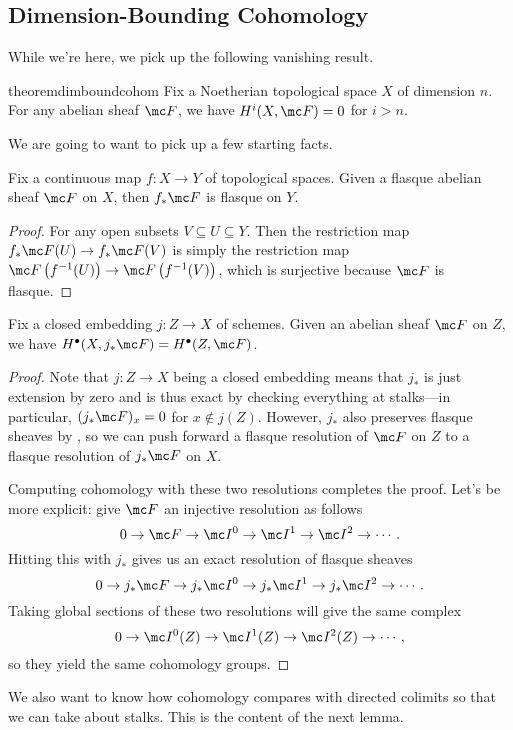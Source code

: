 \documentclass[../notes.tex]{subfiles}
\begin{document}
\subsection{Dimension-Bounding Cohomology}
While we're here, we pick up the following vanishing result.
\begin{restatable}{theorem}{dimboundcohom} \label{thm:dimension-bound-cohom}
	Fix a Noetherian topological space $X$ of dimension $n$. For any abelian sheaf $\mc F$, we have $H^i(X,\mc F)=0$ for $i>n$.
\end{restatable}
We are going to want to pick up a few starting facts.
\begin{lemma} \label{lem:pull-preserves-flasque}
	Fix a continuous map $f\colon X\to Y$ of topological spaces. Given a flasque abelian sheaf $\mc F$ on $X$, then $f_*\mc F$ is flasque on $Y$.
\end{lemma}
\begin{proof}
	For any open subsets $V\subseteq U\subseteq Y$. Then the restriction map $f_*\mc F(U)\to f_*\mc F(V)$ is simply the restriction map $\mc F\left(f^{-1}(U)\right)\to\mc F\left(f^{-1}(V)\right)$, which is surjective because $\mc F$ is flasque.
\end{proof}
\begin{corollary}
	Fix a closed embedding $j\colon Z\to X$ of schemes. Given an abelian sheaf $\mc F$ on $Z$, we have $H^\bullet(X,j_*\mc F)=H^\bullet(Z,\mc F)$.
\end{corollary}
\begin{proof}
	Note that $j\colon Z\to X$ being a closed embedding means that $j_*$ is just extension by zero and is thus exact by checking everything at stalks---in particular, $(j_*\mc F)_x=0$ for $x\notin j(Z)$. However, $j_*$ also preserves flasque sheaves by , so we can push forward a flasque resolution of $\mc F$ on $Z$ to a flasque resolution of $j_*\mc F$ on $X$.
	
	Computing cohomology with these two resolutions completes the proof. Let's be more explicit: give $\mc F$ an injective resolution as follows
	\[0\to\mc F\to\mc I^0\to\mc I^1\to\mc I^2\to\cdots.\]
	Hitting this with $j_*$ gives us an exact resolution of flasque sheaves
	\[0\to j_*\mc F\to j_*\mc I^0\to j_*\mc I^1\to j_*\mc I^2\to\cdots.\]
	Taking global sections of these two resolutions will give the same complex
	\[0\to\mc I^0(Z)\to\mc I^1(Z)\to\mc I^2(Z)\to\cdots,\]
	so they yield the same cohomology groups.
\end{proof}
We also want to know how cohomology compares with directed colimits so that we can take about stalks. This is the content of the next lemma.
\end{document}
